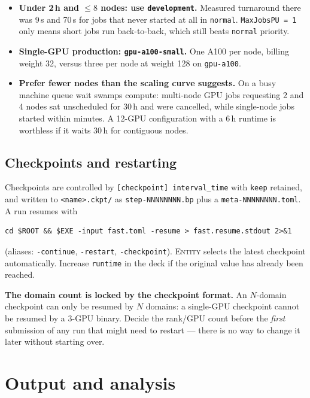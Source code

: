 \documentclass[11pt,a4paper]{article}
\newcommand{\code}[1]{\texttt{\small #1}}
\begin{document}
\begin{itemize}[nosep]
  \item \textbf{Under 2\,h and $\le 8$ nodes: use \code{development}.} Measured
        turnaround there was 9\,s and 70\,s for jobs that never started at all in
        \code{normal}. \code{MaxJobsPU = 1} only means short jobs run back-to-back,
        which still beats \code{normal} priority.
  \item \textbf{Single-GPU production: \code{gpu-a100-small}.} One A100 per node,
        billing weight 32, versus three per node at weight 128 on \code{gpu-a100}.
  \item \textbf{Prefer fewer nodes than the scaling curve suggests.} On a busy machine
        queue wait swamps compute: multi-node GPU jobs requesting 2 and 4 nodes sat
        unscheduled for 30\,h and were cancelled, while single-node jobs started within
        minutes. A 12-GPU configuration with a 6\,h runtime is worthless if it waits
        30\,h for contiguous nodes.
\end{itemize}

\subsection{Checkpoints and restarting}
\label{sec:restart}

Checkpoints are controlled by \code{[checkpoint] interval\_time} with \code{keep}
retained, and written to \code{<name>.ckpt/} as
\code{step-NNNNNNNN.bp} plus a \code{meta-NNNNNNNN.toml}. A run resumes with

\begin{lstlisting}
cd $ROOT && $EXE -input fast.toml -resume > fast.resume.stdout 2>&1
\end{lstlisting}

\noindent (aliases: \code{-continue}, \code{-restart}, \code{-checkpoint}).
\textsc{Entity} selects the latest checkpoint automatically. Increase \code{runtime}
in the deck if the original value has already been reached.

\textbf{The domain count is locked by the checkpoint format.} An $N$-domain checkpoint
can only be resumed by $N$ domains: a single-GPU checkpoint cannot be resumed by a
3-GPU binary. Decide the rank/GPU count before the \emph{first} submission of any run
that might need to restart --- there is no way to change it later without starting
over.

\section{Output and analysis}
\label{sec:analysis}
\end{document}
